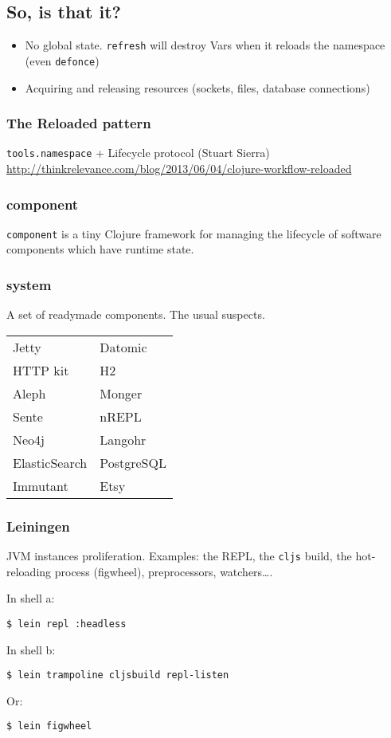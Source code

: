 \documentclass[11pt]{article}
\begin{document}
\subsection*{So, is that it?}
\label{sec:orgheadline30}
\begin{itemize}
\item No global state. \texttt{refresh} will destroy Vars when it reloads the namespace (even \texttt{defonce})
\item Acquiring and releasing resources (sockets, files, database connections)
\end{itemize}
\subsubsection*{The Reloaded pattern}
\label{sec:orgheadline23}
\texttt{tools.namespace} + Lifecycle protocol (Stuart Sierra)
\url{http://thinkrelevance.com/blog/2013/06/04/clojure-workflow-reloaded}
\subsubsection*{component}
\label{sec:orgheadline24}
\texttt{component} is a tiny Clojure framework for managing the lifecycle of software components which have runtime state. 
\subsubsection*{system}
\label{sec:orgheadline25}
A set of readymade components. The usual suspects.
\begin{center}
\begin{tabular}{ll}
Jetty & Datomic\\
HTTP kit & H2\\
Aleph & Monger\\
Sente & nREPL\\
Neo4j & Langohr\\
ElasticSearch & PostgreSQL\\
Immutant & Etsy\\
\end{tabular}
\end{center}
\subsubsection*{Leiningen}
\label{sec:orgheadline26}
JVM instances proliferation. Examples: the REPL, the \texttt{cljs} build, the hot-reloading process (figwheel), preprocessors, watchers\ldots{}.

In shell a:
\begin{verbatim}
$ lein repl :headless
\end{verbatim}
In shell b:
\begin{verbatim}
$ lein trampoline cljsbuild repl-listen
\end{verbatim}
Or:
\begin{verbatim}
$ lein figwheel
\end{verbatim}
\end{document}
